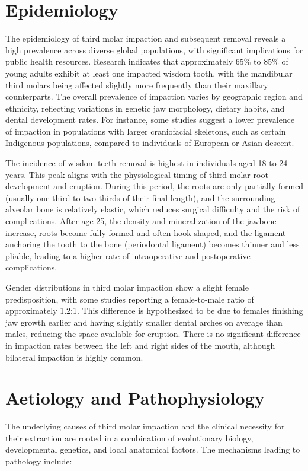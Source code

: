 \section*{Epidemiology}
The epidemiology of third molar impaction and subsequent removal reveals a high prevalence across diverse global populations, with significant implications for public health resources. Research indicates that approximately 65\% to 85\% of young adults exhibit at least one impacted wisdom tooth, with the mandibular third molars being affected slightly more frequently than their maxillary counterparts. The overall prevalence of impaction varies by geographic region and ethnicity, reflecting variations in genetic jaw morphology, dietary habits, and dental development rates. For instance, some studies suggest a lower prevalence of impaction in populations with larger craniofacial skeletons, such as certain Indigenous populations, compared to individuals of European or Asian descent.

The incidence of wisdom teeth removal is highest in individuals aged 18 to 24 years. This peak aligns with the physiological timing of third molar root development and eruption. During this period, the roots are only partially formed (usually one-third to two-thirds of their final length), and the surrounding alveolar bone is relatively elastic, which reduces surgical difficulty and the risk of complications. After age 25, the density and mineralization of the jawbone increase, roots become fully formed and often hook-shaped, and the ligament anchoring the tooth to the bone (periodontal ligament) becomes thinner and less pliable, leading to a higher rate of intraoperative and postoperative complications.

Gender distributions in third molar impaction show a slight female predisposition, with some studies reporting a female-to-male ratio of approximately 1.2:1. This difference is hypothesized to be due to females finishing jaw growth earlier and having slightly smaller dental arches on average than males, reducing the space available for eruption. There is no significant difference in impaction rates between the left and right sides of the mouth, although bilateral impaction is highly common.

\section*{Aetiology and Pathophysiology}
The underlying causes of third molar impaction and the clinical necessity for their extraction are rooted in a combination of evolutionary biology, developmental genetics, and local anatomical factors. The mechanisms leading to pathology include:

